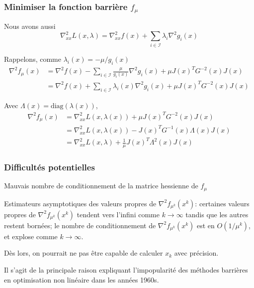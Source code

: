 \documentclass[usepdftitle=false,aspectratio=169]{beamer}
\def\cI{\mathcal{I}}
\begin{document}
\begin{frame}
\frametitle{Minimiser la fonction barrière $f_{\mu}$}

Nous avons aussi
$$
\nabla^2_{xx} L(x,\lambda) = \nabla^2_{xx} f(x)+\sum_{i \in \cI} \lambda_i \nabla^2 g_i(x)
$$

\mbox{}
Rappelons, comme $\lambda_i(x) = -\mu/g_i(x)$
\begin{align*}
\nabla^2 f_{\mu}(x)
&= \nabla^2 f(x) - \sum_{i \in \cI} \frac{\mu}{g_i(x)} \nabla^2 g_i(x) + \mu J(x)^T G^{-2}(x)J(x) \\
&= \nabla^2 f(x) + \sum_{i \in \cI} \lambda_i(x) \nabla^2 g_i(x) + \mu J(x)^T G^{-2}(x)J(x)
\end{align*}

Avec $\Lambda(x) = \mbox{diag}(\lambda(x))$,
\begin{align*}
\nabla^2 f_{\mu}(x)
& = \nabla^2_{xx} L(x,\lambda(x)) + \mu J(x)^T G^{-2}(x) J(x) \\
& = \nabla^2_{xx} L(x,\lambda(x)) - J(x)^T G^{-1}(x) \Lambda(x) J(x) \\
& = \nabla^2_{xx} L(x,\lambda) + \frac{1}{\mu} J(x)^T \Lambda^{2}(x) J(x)
\end{align*}

\end{frame}

\begin{frame}
\frametitle{Difficultés potentielles}

Mauvais nombre de conditionnement de la matrice hessienne de $f_{\mu}$

\mbox{}

Estimateurs asymptotiques des valeurs propres de $\nabla^2 f_{\mu^k}(x^k)$:
certaines valeurs propres de $\nabla^2 f_{\mu^k}(x^k)$ tendent vers l'infini comme $k \rightarrow \infty$ tandis que les autres restent bornées; le nombre de conditionnement de $\nabla^2 f_{\mu^k}(x^k)$ est en $O(1/\mu^k)$, et explose comme $k \rightarrow \infty$.

\mbox{}

Dès lors, on pourrait ne pas être capable de calculer $x_k$ avec précision.

Il s'agit de la principale raison expliquant l'impopularité des méthodes barrières en optimisation non linéaire dans les années 1960s.

\end{frame}
\end{document}
